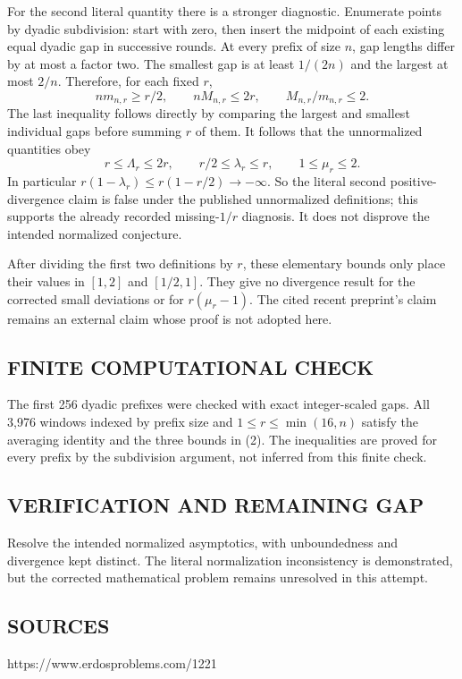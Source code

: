 For the second literal quantity there is a stronger diagnostic. Enumerate
points by dyadic subdivision: start with zero, then insert the midpoint of
each existing equal dyadic gap in successive rounds. At every prefix of size
$n$, gap lengths differ by at most a factor two. The smallest gap is at least
$1/(2n)$ and the largest at most $2/n$. Therefore, for each fixed $r$,
\[nm_{n,r}\ge r/2,\qquad nM_{n,r}\le2r,\qquad M_{n,r}/m_{n,r}\le2.\tag{2}\]
The last inequality follows directly by comparing the largest and smallest
individual gaps before summing $r$ of them.
It follows that the unnormalized quantities obey
\[r\le\Lambda_r\le2r,\qquad r/2\le\lambda_r\le r,\qquad1\le\mu_r\le2.\]
In particular $r(1-\lambda_r)\le r(1-r/2)\to-\infty$.
So the literal second positive-divergence claim is false under the published
unnormalized definitions; this supports the already recorded missing-$1/r$
diagnosis. It does not disprove the intended normalized conjecture.

After dividing the first two definitions by $r$, these elementary bounds only
place their values in $[1,2]$ and $[1/2,1]$. They give no divergence result for
the corrected small deviations or for $r(\mu_r-1)$. The cited recent preprint's
claim remains an external claim whose proof is not adopted here.

\subsection*{FINITE COMPUTATIONAL CHECK}
The first 256 dyadic prefixes were checked with exact integer-scaled gaps. All 3,976 windows indexed by prefix size and $1\le r\le\min(16,n)$ satisfy the averaging identity and the three bounds in (2). The inequalities are proved for every prefix by the subdivision argument, not inferred from this finite check.

\subsection*{VERIFICATION AND REMAINING GAP}
Resolve the intended normalized asymptotics, with unboundedness and divergence
kept distinct. The literal normalization inconsistency is demonstrated, but
the corrected mathematical problem remains unresolved in this attempt.

\subsection*{SOURCES}
https://www.erdosproblems.com/1221

